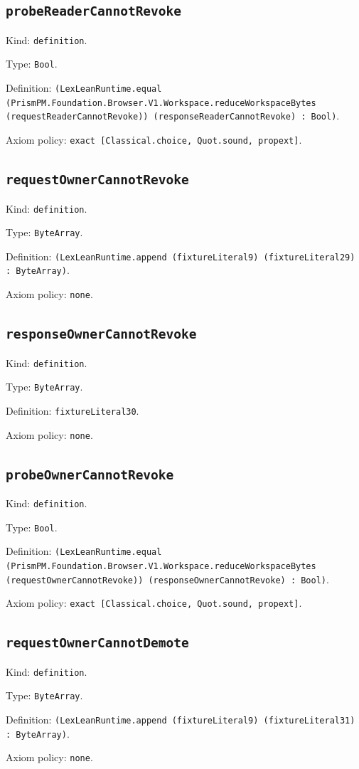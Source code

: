 \documentclass[11pt]{article}
\begin{document}
\subsection*{\texttt{probeReaderCannotRevoke}}
\noindent Kind: \texttt{definition}.\par
\noindent Type: \texttt{Bool}.\par
\noindent Definition: \texttt{(LexLeanRuntime.equal (PrismPM.Foundation.Browser.V1.Workspace.reduceWorkspaceBytes (requestReaderCannotRevoke)) (responseReaderCannotRevoke) : Bool)}.\par
\noindent Axiom policy: \texttt{exact [Classical.choice, Quot.sound, propext]}.\par
\subsection*{\texttt{requestOwnerCannotRevoke}}
\noindent Kind: \texttt{definition}.\par
\noindent Type: \texttt{ByteArray}.\par
\noindent Definition: \texttt{(LexLeanRuntime.append (fixtureLiteral9) (fixtureLiteral29) : ByteArray)}.\par
\noindent Axiom policy: \texttt{none}.\par
\subsection*{\texttt{responseOwnerCannotRevoke}}
\noindent Kind: \texttt{definition}.\par
\noindent Type: \texttt{ByteArray}.\par
\noindent Definition: \texttt{fixtureLiteral30}.\par
\noindent Axiom policy: \texttt{none}.\par
\subsection*{\texttt{probeOwnerCannotRevoke}}
\noindent Kind: \texttt{definition}.\par
\noindent Type: \texttt{Bool}.\par
\noindent Definition: \texttt{(LexLeanRuntime.equal (PrismPM.Foundation.Browser.V1.Workspace.reduceWorkspaceBytes (requestOwnerCannotRevoke)) (responseOwnerCannotRevoke) : Bool)}.\par
\noindent Axiom policy: \texttt{exact [Classical.choice, Quot.sound, propext]}.\par
\subsection*{\texttt{requestOwnerCannotDemote}}
\noindent Kind: \texttt{definition}.\par
\noindent Type: \texttt{ByteArray}.\par
\noindent Definition: \texttt{(LexLeanRuntime.append (fixtureLiteral9) (fixtureLiteral31) : ByteArray)}.\par
\noindent Axiom policy: \texttt{none}.\par
\end{document}
